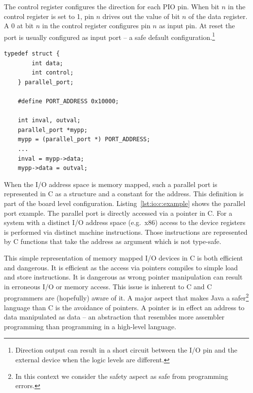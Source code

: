 The control register configures the direction for each PIO pin. When
bit $n$ in the control register is set to 1, pin $n$ drives out the
value of bit $n$ of the data register. A 0 at bit $n$ in the control
register configures pin $n$ as input pin. At reset the port is
usually configured as input port -- a safe default
configuration.\footnote{Direction output can result in a short
circuit between the I/O pin and the external device when the logic
levels are different.}

\begin{lstlisting}[float=t,caption={Definition and usage of a parallel port in C},
label=lst:io:c:example]
    typedef struct {
        int data;
        int control;
    } parallel_port;

    #define PORT_ADDRESS 0x10000;

    int inval, outval;
    parallel_port *mypp;
    mypp = (parallel_port *) PORT_ADDRESS;
    ...
    inval = mypp->data;
    mypp->data = outval;
\end{lstlisting}

When the I/O address space is memory mapped, such a parallel port is
represented in C as a structure and a constant for the address. This
definition is part of the board level configuration.
Listing~\ref{lst:io:c:example} shows the parallel port example. The
parallel port is directly accessed via a pointer in C. For a system
with a distinct I/O address space (e.g.\ x86) access to the device
registers is performed via distinct machine instructions. Those
instructions are represented by C functions that take the address as
argument which is not type-safe.

This simple representation of memory mapped I/O devices in C is both
efficient and dangerous. It is efficient as the access via pointers
compiles to simple load and store instructions. It is dangerous as
wrong pointer manipulation can result in erroneous I/O or memory
access. This issue is inherent to C and C programmers are (hopefully)
aware of it. A major aspect that makes Java a safer\footnote{In this
context we consider the safety aspect as safe from programming
errors.} language than C is the avoidance of pointers. A pointer is
in effect an address to data manipulated as data -- an abstraction
that resembles more assembler programming than programming in a
high-level language.

